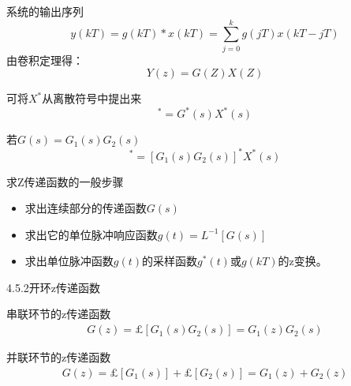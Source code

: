 \begin{frame}
\begin{block}{系统的输出序列}
\[y(kT)=g(kT)*x(kT)=\sum_{j=0}^kg(jT)x(kT-jT)\]
由卷积定理得：
\[Y(z)=G(Z)X(Z)\]
\end{block}
\end{frame}

\begin{frame}
\begin{block}{可将$X^*$从离散符号中提出来}
\begin{equation*}
[G(s)X^*(s)]^*=G^*(s)X^*(s)
\end{equation*}
\end{block}
\begin{block}{若$G(s)=G_1(s)G_2(s)$}
\begin{equation*}
[G_1(s)G_2(s)X^*(s)]^*=[G_1(s)G_2(s)]^*X^*(s)
\end{equation*}
\end{block}
\end{frame}

\begin{frame}
\begin{block}{求Z传递函数的一般步骤}
\begin{itemize}
\item 求出连续部分的传递函数$G(s)$
\item 求出它的单位脉冲响应函数$g(t)=L^{-1}[G(s)]$
\item 求出单位脉冲函数$g(t)$的采样函数$g^*(t)$或$g(kT)$的z变换。
\end{itemize}
\end{block}
\end{frame}

\begin{frame}{4.5.2开环z传递函数}
\begin{block}{串联环节的z传递函数}
\begin{eqnarray*}
G(z)=\pounds[G_1(s)G_2(s)]=G_1(z)G_2(s)
\end{eqnarray*}
\end{block}
\begin{block}{并联环节的z传递函数}
\begin{eqnarray*}
G(z)=\pounds[G_1(s)]+\pounds[G_2(s)]=G_1(z)+G_2(z)
\end{eqnarray*}
\end{block}
\end{frame}

